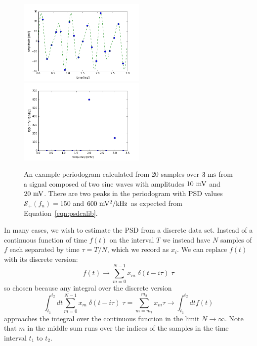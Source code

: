 \documentclass[12pt]{article}
\begin{document}
%
%

\begin{figure}[thb]
\begin{center}
{\includegraphics[width=0.55\textwidth]{figs/periodogram_ts.png}}\\
{\includegraphics[width=0.55\textwidth]{figs/periodogram_eg.png}}
\end{center}
\caption{\label{fig:periodogram}  An example periodogram calculated from 20 samples over $3~\rm ms$ from a signal composed of two sine waves with amplitudes $10~\rm mV$ and $20~\rm mV$.  There are two peaks in the periodogram with PSD values $\mathcal{S}_{+}(f_n) = 150$ and $600~{\rm mV^2} / {\rm kHz}$ as expected from Equation~\ref{eqn:psdcalib}.
}
\end{figure}

In many cases, we wish to estimate the PSD from a discrete data set.  Instead of a continuous function of time $f(t)$ on the interval $T$ we instead have $N$ samples of $f$ each separated by time $\tau = T/N$, which we record as $x_i$.  We can replace $f(t)$ with its discrete version:
\begin{equation}
f(t) \to \sum_{m=0}^{N-1} x_m \; \delta(t - i\tau) \; \tau \label{eqn:discretef}
\end{equation}
so chosen because any integral over the discrete version
\begin{displaymath}
\int_{t_1}^{t_2} dt \sum_{m=0}^{N-1} x_m \; \delta(t - i\tau) \; \tau = \sum_{m=m_1}^{m_2} x_m  \tau
\to \int_{t_1}^{t_2} dt f(t)  
\end{displaymath}
approaches the integral over the continuous function in the limit $N \to \infty$.  Note that $m$ in the middle sum runs over the indices of the samples in the time interval $t_1$ to $t_2$.
\end{document}
